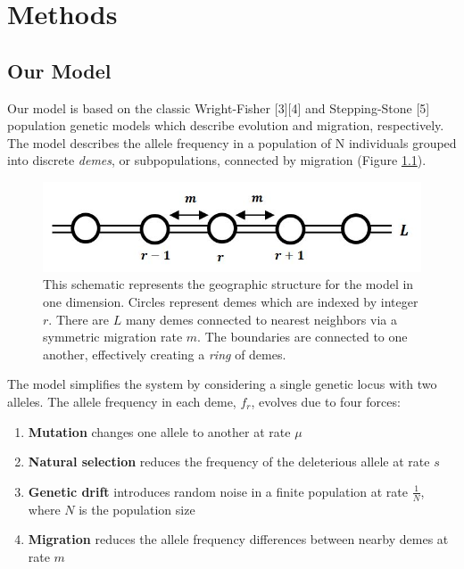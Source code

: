 \chapter{Methods}

\section{Our Model}

Our model is based on the classic Wright-Fisher [3][4] and Stepping-Stone [5] population genetic models which describe evolution and migration, respectively. The model describes the allele frequency in a population of N individuals grouped into discrete \textit{demes}, or subpopulations, connected by migration (Figure \ref{fig:schematic}). 

\begin{figure}[h]
    \centering
    \includegraphics[scale=0.8]{img/model_schematic.JPG}
    \caption{This schematic represents the geographic structure for the model in one dimension. Circles represent demes which are indexed by integer $r$. There are $L$ many demes connected to nearest neighbors via a symmetric migration rate $m$. The boundaries are connected to one another, effectively creating a \textit{ring} of demes.}
    \label{fig:schematic}
\end{figure}
	

The model simplifies the system by considering a single genetic locus with two alleles. The allele frequency in each deme, $f_r$, evolves due to four forces:


\begin{enumerate}
    \item \textbf{Mutation} changes one allele to another at rate $\mu$
    \item \textbf{Natural selection} reduces the frequency of the deleterious allele at rate $s$
    \item \textbf{Genetic drift} introduces random noise in a finite population at rate $\frac{1}{N}$, \\ where $N$ is the population size
    \item \textbf{Migration} reduces the allele frequency differences between nearby demes at rate $m$
\end{enumerate}

